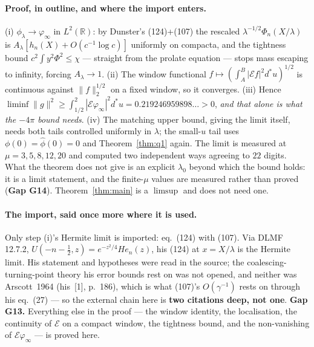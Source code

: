 \documentclass[11pt,a4paper]{article}
\theoremstyle{plain}
\theoremstyle{definition}
\theoremstyle{remark}
\newcommand{\R}{\mathbb{R}}
\newcommand{\E}{\mathcal{E}}
\begin{document}
\paragraph{Proof, in outline, and where the import enters.}  (i)
$\phi_\lambda\to\varphi_\infty$ in $L^2(\R)$: by Dunster's (124)+(107) the
rescaled $\lambda^{-1/2}\Phi_n(X/\lambda)$ is $A_\lambda[h_n(X)+O(c^{-1}\log c)]$
uniformly on compacta, and the tightness bound $c^2\int y^2\Phi^2\le\chi$ ---
straight from the prolate equation --- stops mass escaping to infinity, forcing
$A_\lambda\to1$.  (ii) The window functional
$f\mapsto(\int_A^B|\E f|^2d^*u)^{1/2}$ is continuous against
$\|f\|_2^{1/2}$ on a fixed window, so it converges.  (iii) Hence
$\liminf\|g\|^2\ge\int_{1/2}^2|\E\varphi_\infty|^2d^*u=0.219246959898\ldots>0$,
\emph{and that alone is what the $-4\pi$ bound needs}.  (iv) The matching upper
bound, giving the limit itself, needs both tails controlled uniformly in
$\lambda$; the small-$u$ tail uses $\phi(0)=\widehat\phi(0)=0$ and
Theorem~\ref{thm:q1} again.  The limit is measured at $\mu=3,5,8,12,20$ and
computed two independent ways agreeing to $22$ digits.  What the theorem does
not give is an explicit $\lambda_0$ beyond which the bound holds: it is a limit
statement, and the finite-$\mu$ values are measured rather than proved
(\textbf{Gap G14}).  Theorem~\ref{thm:main} is a $\limsup$ and does not need
one.

\paragraph{The import, said once more where it is used.}  Only step (i)'s
Hermite limit is imported: \cite{Dunster2017} eq.\ (124) with (107).  Via DLMF
12.7.2, $U(-n-\tfrac12,z)=e^{-z^2/4}\mathit{He}_n(z)$, his (124) at
$x=X/\lambda$ is the Hermite limit.  His statement and hypotheses were read in
the source; the coalescing-turning-point theory his error bounds rest on was
not opened, and neither was Arscott~1964 (his~[1], p.~186), which is what
(107)'s $O(\gamma^{-1})$ rests on through his eq.~(27) --- so the external
chain here is \textbf{two citations deep, not one}.  \textbf{Gap G13.}
Everything else in the proof --- the window identity, the
localisation, the continuity of $\E$ on a compact window, the tightness bound,
and the non-vanishing of $\E\varphi_\infty$ --- is proved here.
\end{document}

